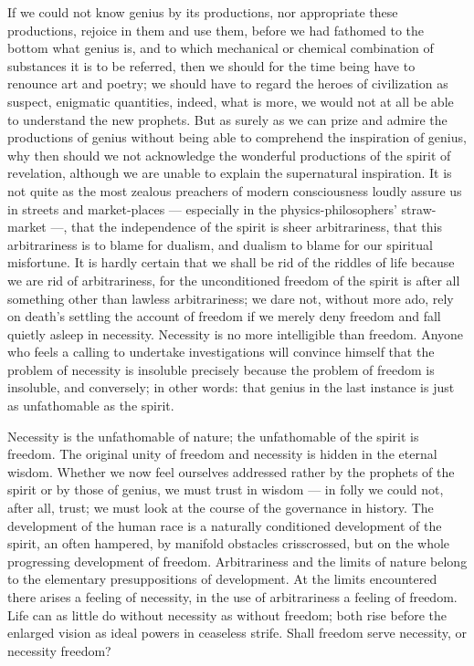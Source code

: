\documentclass[12pt,a4paper,openany]{book}
\newcommand{\opage}[1]{\marginnote{\footnotesize\textit{[#1]}}}
\begin{document}
If we could not know genius by its productions,
nor appropriate these productions,
rejoice in them and use them, before we had fathomed
to the bottom what genius is, and to which mechanical
or chemical combination of substances it is to be referred,
then we should for the time being have to renounce
art and poetry; we should have to regard the heroes of civilization
as suspect, enigmatic quantities, indeed, what is more,
we would not at all be able to understand the new
prophets. But as surely as we can prize and admire
\setcounter{footnote}{0}%
\opage{16}the productions of genius without being able to comprehend the
inspiration of genius, why then should we not acknowledge
the wonderful productions of the spirit of revelation,
although we are unable to explain the supernatural
inspiration. It is not quite as the
most zealous preachers of modern consciousness loudly assure us
in streets and market-places --- especially in the physics-philosophers'
straw-market ---, that the independence of the spirit is
sheer arbitrariness, that this arbitrariness is to blame for
dualism, and dualism to blame for our spiritual misfortune.
It is hardly certain that we shall be rid of the riddles of life
because we are rid of arbitrariness, for the unconditioned
freedom of the spirit is after all something other than lawless arbitrariness;
we dare not, without more ado, rely on death's settling
the account of freedom if we merely deny freedom
and fall quietly asleep in necessity. Necessity is
no more intelligible than freedom. Anyone who feels
a calling to undertake investigations will convince himself
that the problem of necessity is insoluble precisely because
the problem of freedom is insoluble, and conversely; in other
words: that genius in the last instance is just as unfathomable
as the spirit.

Necessity is the unfathomable of nature; the
unfathomable of the spirit is freedom. The original unity
of freedom and necessity is hidden in the eternal
wisdom. Whether we now feel ourselves addressed rather by
the prophets of the spirit or by those of genius, we must trust in
wisdom --- in folly we could not, after all, trust;
we must look at the course of the governance in history. The development
of the human race is a naturally conditioned development of the spirit,
an often hampered, by manifold obstacles crisscrossed,
but on the whole progressing development of freedom.
\setcounter{footnote}{0}%
\opage{17}Arbitrariness and the limits of nature belong to the elementary
presuppositions of development. At the limits encountered
there arises a feeling of necessity, in the use of arbitrariness
a feeling of freedom. Life can as
little do without necessity as without freedom; both
rise before the enlarged vision as ideal powers in
ceaseless strife. Shall freedom serve necessity,
or necessity freedom?
\end{document}
